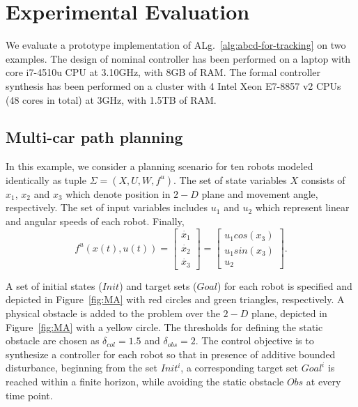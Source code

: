 
\section{Experimental Evaluation}\label{sec:experiments}
We evaluate a prototype implementation of ALg.~\ref{alg:abcd-for-tracking}
on two examples. 
The design of nominal controller has been performed on a laptop with core i7-4510u CPU at 3.10GHz, with 8GB of
RAM.
The formal controller synthesis has been performed
on a cluster with 4 Intel Xeon E7-8857 v2 CPUs (48 cores in total) at 3GHz, with 1.5TB of
RAM.

\subsection{Multi-car path planning}\label{sec:MultiAgent}

In this example, we consider a planning scenario for ten robots modeled identically as tuple $\Sigma=(X,U,W,f^u)$. The set of state variables $X$ consists of $x_1$, $x_2$ and $x_3$ which denote position in $2-D$ plane and movement angle, respectively. The set of input variables includes $u_1$ and $u_2$ which represent linear and angular speeds of each robot. Finally,
\begin{equation}\label{eq:unicycle_ss}
	f^{u}(x(t),u(t))=
	\begin{bmatrix}
		\dot{x_1}\\
		\dot{x_2}\\
		\dot{x_3}
	\end{bmatrix}=
	\begin{bmatrix}
		u_1cos(x_3)\\
		u_1sin(x_3)\\
		u_2
	\end{bmatrix}.
\end{equation}

A set of initial states ($Init$) and target sets ($Goal$) for each robot is specified and depicted in Figure~\ref{fig:MA} with red circles and green triangles, respectively. A physical obstacle is added to the problem over the $2-D$ plane, depicted in Figure~\ref{fig:MA} with a yellow circle. The thresholds for defining the static obstacle are chosen as $\delta_{col}=1.5$ and $\delta_{obs}=2$. The control objective is to synthesize a controller for each robot so that in presence of additive bounded disturbance, beginning from the set $Init^i$, a corresponding target set $Goal^i$ is reached within a finite horizon, while avoiding the static obstacle $Obs$ at every time point. 

